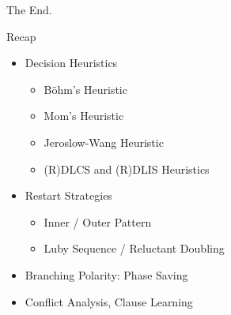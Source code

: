 \documentclass[t]{sdqbeamer}
\begin{document}
\begin{frame}{The End.}
\begin{block}{Recap}
	\begin{itemize}\setlength{\itemsep}{1em}
		\item Decision Heuristics
		\begin{itemize}\setlength{\itemsep}{1ex}
			\item Böhm's Heuristic
			\item Mom's Heuristic
			\item Jeroslow-Wang Heuristic
			\item (R)DLCS and (R)DLIS Heuristics
		\end{itemize}
		\item Restart Strategies
		\begin{itemize}\setlength{\itemsep}{1ex}
			\item Inner / Outer Pattern
			\item Luby Sequence / Reluctant Doubling
		\end{itemize}
		\item Branching Polarity: Phase Saving
		\item Conflict Analysis, Clause Learning
	\end{itemize}
\end{block}
\end{frame}
\end{document}
